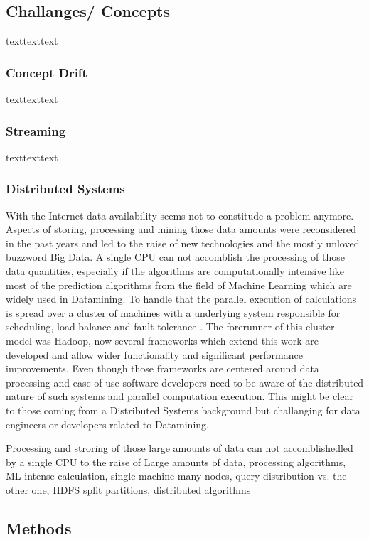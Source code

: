 \documentclass[12pt]{article}
\begin{document}
\subsection{Challanges/ Concepts}
texttexttext

\subsubsection{Concept Drift}
texttexttext

\subsubsection{Streaming}
texttexttext

\subsubsection{Distributed Systems}
With the Internet data availability seems not to constitude a problem anymore. Aspects of storing, processing and mining those data amounts were reconsidered in the past years and led to the raise of new technologies and the mostly unloved buzzword Big Data. A single CPU can not accomblish the processing of those data quantities, especially if the algorithms are computationally intensive like most of the prediction algorithms from the field of Machine Learning which are widely used in Datamining. To handle that  the parallel execution of calculations is spread over a cluster of machines with a underlying system responsible for scheduling, load balance and fault tolerance \citep[p. 10]{zaharia2010} . The forerunner of this cluster model was Hadoop, now several frameworks which extend this work are developed and allow wider functionality and significant performance improvements. Even though those frameworks are centered around data processing and ease of use software developers need to be aware of the distributed nature of such systems and parallel computation execution. This might be clear to those coming from a Distributed Systems background but challanging for data engineers or developers related to Datamining.  


 Processing and stroring of those large amounts of data can not accomblishedled by a single CPU to the raise of    
Large amounts of data, processing algorithms, ML intense calculation, single machine many nodes, query distribution vs. the other one, HDFS split partitions,  distributed algorithms  

\subsection{Methods}
\end{document}
